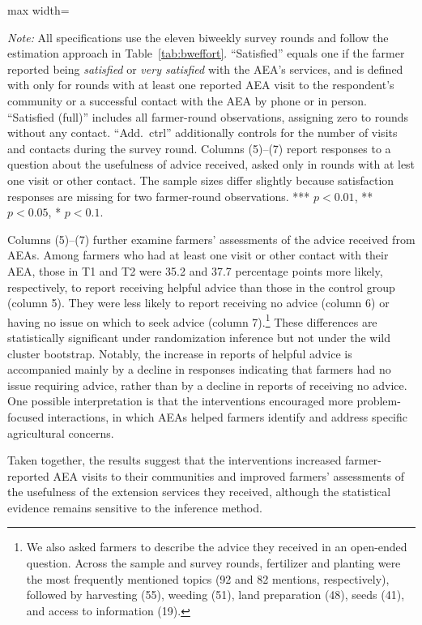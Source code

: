 \documentclass[11pt]{article}
\newcommand{\fittable}[1]{%
  \begin{adjustbox}{max width=\linewidth}\scriptsize\end{adjustbox}}
\newcommand{\tnote}[1]{%
  \par\vspace{3pt}%
  \noindent\begin{minipage}{\linewidth}%
    \scriptsize\setlength{\parindent}{0pt}\textit{Note:} #1%
  \end{minipage}}
\begin{document}
\begin{table}[H]
\centering
\caption{Farmer satisfaction and perceived usefulness of extension advice}
\label{tab:bwsatisfy}
\fittable{tmp/ms_bw_satcontent}
\tnote{All specifications use the eleven biweekly survey rounds and follow the estimation approach in Table~\ref{tab:bweffort}. ``Satisfied'' equals one if the farmer reported being \emph{satisfied} or \emph{very satisfied} with the AEA's services, and is defined with only for rounds with at least one reported AEA visit to the respondent's community or a successful contact with the AEA by phone or in person. ``Satisfied (full)'' includes all farmer-round observations, assigning zero to rounds without any contact. ``Add.\ ctrl'' additionally controls for the number of visits and contacts during the survey round. Columns (5)--(7) report responses to a question about the usefulness of advice received, asked only in rounds with at lest one visit or other contact.
The sample sizes differ slightly because satisfaction responses are missing for two farmer-round observations. *** $p<0.01$, ** $p<0.05$, * $p<0.1$.}
\end{table}


Columns (5)--(7) further examine farmers' assessments of the advice received from AEAs. Among farmers who had at least one visit or other contact with their AEA, those in T1 and T2 were 35.2 and 37.7 percentage points more likely, respectively, to report receiving helpful advice than those in the control group (column 5). They were less likely to report receiving no advice (column 6) or having no issue on which to seek advice (column 7).\footnote{We also asked farmers to describe the advice they received in an open-ended question. Across the sample and survey rounds, fertilizer and planting were the most frequently mentioned topics (92 and 82 mentions, respectively), followed by harvesting (55), weeding (51), land preparation (48), seeds (41), and access to information (19).} These differences are statistically significant under randomization inference but not under the wild cluster bootstrap. Notably, the increase in reports of helpful advice is accompanied mainly by a decline in responses indicating that farmers had no issue requiring advice, rather than by a decline in reports of receiving no advice. One possible interpretation is that the interventions encouraged more problem-focused interactions, in which AEAs helped farmers identify and address specific agricultural concerns.

Taken together, the results suggest that the interventions increased farmer-reported AEA visits to their communities and improved farmers' assessments of the usefulness of the extension services they received, although the statistical evidence remains sensitive to the inference method. 
\end{document}
